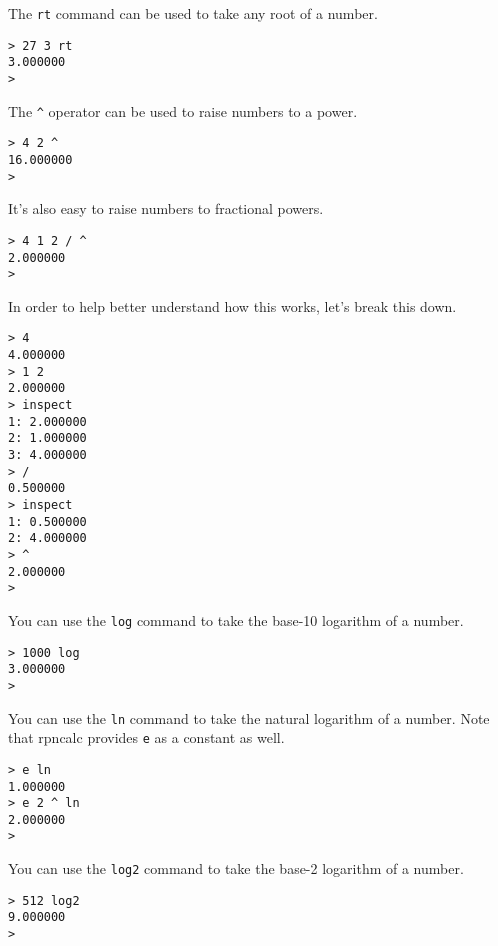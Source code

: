 \documentclass[12pt,letterpaper]{book}
\begin{document}
\noindent The \verb|rt| command can be used to take any root of a number.

\begin{lstlisting}
> 27 3 rt
3.000000
> 
\end{lstlisting}

\noindent The \verb|^| operator can be used to raise numbers to a power.

\begin{lstlisting}
> 4 2 ^
16.000000
> 
\end{lstlisting}

\noindent It's also easy to raise numbers to fractional powers.

\begin{lstlisting}
> 4 1 2 / ^
2.000000
> 
\end{lstlisting}

\noindent In order to help better understand how this works, let's break this down.

\begin{lstlisting}
> 4
4.000000
> 1 2
2.000000
> inspect
1: 2.000000
2: 1.000000
3: 4.000000
> /
0.500000
> inspect
1: 0.500000
2: 4.000000
> ^
2.000000
> 
\end{lstlisting}

\noindent You can use the \verb|log| command to take the base-10 logarithm of a number.

\begin{lstlisting}
> 1000 log 
3.000000
> 
\end{lstlisting}

\noindent You can use the \verb|ln| command to take the natural logarithm of a number. Note that rpncalc provides \verb|e| as a constant as well.

\begin{lstlisting}
> e ln
1.000000
> e 2 ^ ln
2.000000
> 
\end{lstlisting}

\noindent You can use the \verb|log2| command to take the base-2 logarithm of a number.

\begin{lstlisting}
> 512 log2
9.000000
> 
\end{lstlisting}
\end{document}
